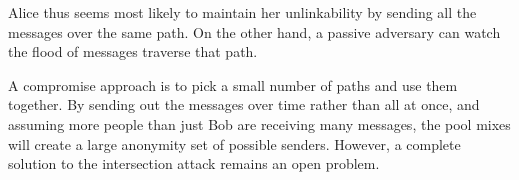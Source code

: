 \documentclass[11pt]{IEEEtran}
\begin{document}

Alice thus seems most likely to maintain her unlinkability by sending all
the messages over the same path. On the other hand, a passive adversary
can watch the flood of messages traverse that path.

A compromise approach is to pick a small number of paths and use them
together. By sending out the messages over time rather than all at once,
and assuming more people than just Bob are receiving many messages,
the pool mixes will create a large anonymity set of possible senders.
However, a complete solution to the intersection attack remains an
open problem.




\end{document}
